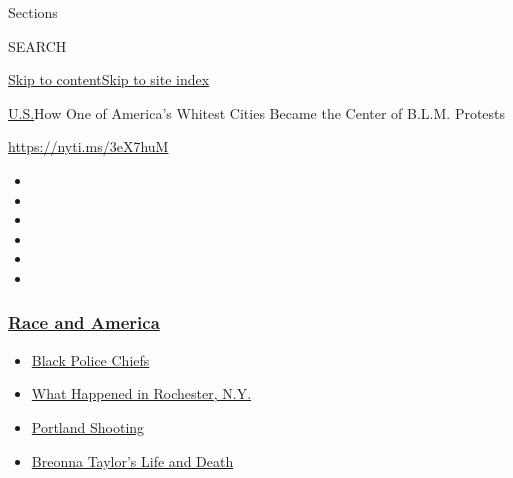 Sections

SEARCH

\protect\hyperlink{site-content}{Skip to
content}\protect\hyperlink{site-index}{Skip to site index}

\href{/section/us}{U.S.}\textbar{}How One of America's Whitest Cities
Became the Center of B.L.M. Protests

\url{https://nyti.ms/3eX7huM}

\begin{itemize}
\item
\item
\item
\item
\item
\item
\end{itemize}

\hypertarget{race-and-america}{%
\subsubsection{\texorpdfstring{\href{https://www.nytimes3xbfgragh.onion/news-event/george-floyd-protests-minneapolis-new-york-los-angeles?name=styln-george-floyd\&region=TOP_BANNER\&block=storyline_menu_recirc\&action=click\&pgtype=Article\&impression_id=77a0fee0-f52b-11ea-8f57-43e30c511e3d\&variant=undefined}{Race
and America}}{Race and America}}\label{race-and-america}}

\begin{itemize}
\tightlist
\item
  \href{https://www.nytimes3xbfgragh.onion/2020/09/11/us/black-police-chiefs-reform.html?name=styln-george-floyd\&region=TOP_BANNER\&block=storyline_menu_recirc\&action=click\&pgtype=Article\&impression_id=77a0fee1-f52b-11ea-8f57-43e30c511e3d\&variant=undefined}{Black
  Police Chiefs}
\item
  \href{https://www.nytimes3xbfgragh.onion/2020/09/04/nyregion/rochester-police-daniel-prude.html?name=styln-george-floyd\&region=TOP_BANNER\&block=storyline_menu_recirc\&action=click\&pgtype=Article\&impression_id=77a0fee2-f52b-11ea-8f57-43e30c511e3d\&variant=undefined}{What
  Happened in Rochester, N.Y.}
\item
  \href{https://www.nytimes3xbfgragh.onion/2020/08/30/us/portland-shooting-explained.html?name=styln-george-floyd\&region=TOP_BANNER\&block=storyline_menu_recirc\&action=click\&pgtype=Article\&impression_id=77a0fee3-f52b-11ea-8f57-43e30c511e3d\&variant=undefined}{Portland
  Shooting}
\item
  \href{https://www.nytimes3xbfgragh.onion/2020/08/30/us/breonna-taylor-police-killing.html?name=styln-george-floyd\&region=TOP_BANNER\&block=storyline_menu_recirc\&action=click\&pgtype=Article\&impression_id=77a0fee4-f52b-11ea-8f57-43e30c511e3d\&variant=undefined}{Breonna
  Taylor's Life and Death}
\end{itemize}

